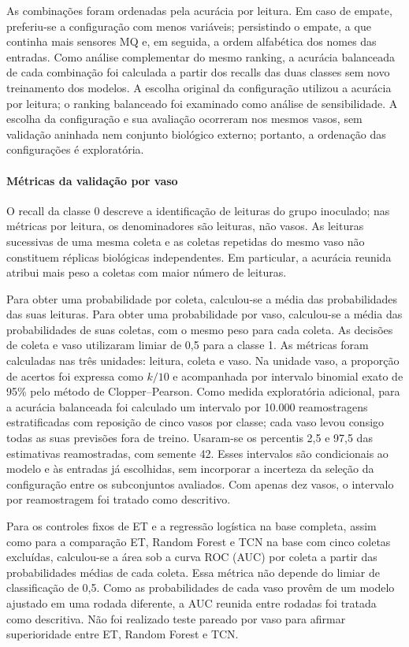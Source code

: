 As combinações foram ordenadas pela acurácia por leitura. Em caso de
empate, preferiu-se a configuração com menos variáveis; persistindo
o empate, a que continha mais sensores MQ e, em seguida, a ordem
alfabética dos nomes das entradas. Como análise complementar do mesmo
ranking, a acurácia balanceada de cada combinação foi calculada a partir
dos recalls das duas classes
sem novo treinamento dos modelos. A escolha original da configuração
utilizou a acurácia por leitura; o ranking balanceado foi examinado como
análise de sensibilidade. A escolha da configuração
e sua avaliação ocorreram nos mesmos vasos, sem validação aninhada
nem conjunto biológico externo; portanto, a ordenação das
configurações é exploratória.

\paragraph{Métricas da validação por vaso}
\label{subsec:metricas_loso_complementar}

O recall da classe 0 descreve a identificação de leituras do grupo
inoculado; nas métricas por leitura, os denominadores são leituras, não
vasos. As leituras sucessivas de uma mesma coleta e as coletas repetidas do mesmo
vaso não constituem réplicas biológicas independentes. Em particular,
a acurácia reunida atribui mais peso a coletas com maior número de leituras.

Para obter uma probabilidade por coleta, calculou-se a média das
probabilidades das suas leituras. Para obter uma probabilidade por vaso,
calculou-se a média das probabilidades de suas coletas, com o mesmo peso para
cada coleta. As decisões de coleta e vaso utilizaram limiar de 0,5 para a
classe 1.
As métricas foram calculadas nas três unidades:
leitura, coleta e vaso. Na unidade vaso, a proporção de acertos foi
expressa como $k/10$ e acompanhada por intervalo binomial exato de
95\% pelo método de Clopper--Pearson. Como medida exploratória adicional,
para a acurácia balanceada foi calculado um intervalo por 10.000
reamostragens estratificadas com reposição de
cinco vasos por classe; cada vaso levou consigo todas as suas previsões
fora de treino. Usaram-se os percentis 2,5 e 97,5 das estimativas
reamostradas, com semente 42. Esses intervalos são condicionais ao modelo
e às entradas já escolhidas, sem incorporar a incerteza da seleção da
configuração entre os subconjuntos avaliados. Com apenas dez vasos, o
intervalo por reamostragem foi tratado como descritivo.

Para os controles fixos de ET e a regressão logística na base completa,
assim como para a comparação ET, Random Forest e TCN na base com cinco
coletas excluídas, calculou-se a área sob a curva ROC (AUC) por coleta a
partir das probabilidades médias de cada coleta. Essa métrica não depende do
limiar de classificação de 0,5. Como as probabilidades de cada vaso
provêm de um modelo ajustado em uma rodada diferente, a AUC reunida
entre rodadas foi tratada como descritiva. Não foi realizado teste pareado
por vaso para afirmar superioridade entre ET, Random Forest e TCN.

